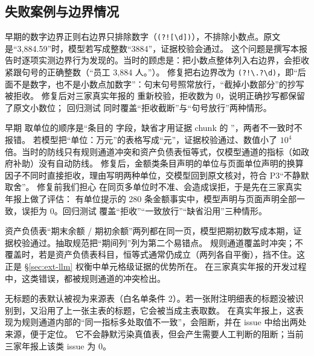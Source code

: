 \subsection{失败案例与边界情况}
\label{sec:ext-fail}

\begin{failcase}
早期的数字边界正则右边界只排除数字（\texttt{(?![\textbackslash d])}），不排除小数点。原文是“3,884.59”时，模型若写成整数“3884”，证据校验会通过。
这个问题是撰写本报告时逐项实测边界行为发现的。当时的顾虑是：把小数点整体列入右边界，会拒收紧跟句号的正确整数（“员工 3,884 人。”）。
修复把右边界改为 \texttt{(?!\textbackslash .?\textbackslash d)}，即“后面不是数字，也不是小数点加数字”：句末句号照常放行，“截掉小数部分”的抄写被拒收。
修复后对三家真实年报的  重新校验，拒收数为 0，说明正确抄写都保留了原文小数位；
回归测试  同时覆盖“拒收截断”与“句号放行”两种情形。
\end{failcase}

\begin{failcase}
早期  取单位的顺序是“条目的  字段，缺省才用证据 chunk 的 ”，两者不一致时不报错。
若模型把“单位：万元”的表格写成“元”，证据校验通过、数值小了 $10^4$ 倍。当时的防线只有规则通道冲突和资产负债表恒等式，仅模型通道的指标（如政府补助）没有自动防线。
修复后，金额类条目声明的单位与页面单位声明的换算因子不同时直接拒收，理由写明两种单位，交模型回到原文核对，符合 P3“不静默取舍”。
修复前我们担心  在同页多单位时不准、会造成误拒，于是先在三家真实年报上做了评估：
有单位提示的 280 条金额事实中，模型声明与页面声明全部一致，误拒为 0。回归测试  覆盖“拒收”“一致放行”“缺省沿用”三种情形。
\end{failcase}

\begin{failcase}
资产负债表“期末余额 / 期初余额”两列都在同一页，模型把期初数写成本期，证据校验通过。抽取规范把“期间列”列为第二个易错点。
规则通道覆盖时冲突；不覆盖时，若是资产负债表科目，恒等式通常仍成立（两列各自平衡），挡不住。这正是 \S\ref{sec:ext-llm} 权衡中单元格级证据的优势所在。
在三家真实年报的开发过程中，这类错误，都被规则通道的冲突检出。
\end{failcase}

\begin{failcase}[：表格标题识别失败导致白名单失效]
无标题的表默认被视为来源表（白名单条件 2）。若一张附注明细表的标题没被识别到，又沿用了上一张主表的标题，它会被当成主表取数。
在真实年报上，这表现为规则通道内部的“同一指标多处取值不一致”，会阻断，并在 issue 中给出两处来源，便于定位。
它不会静默污染真值表，但会产生需要人工判断的阻断；当前三家年报上该类 issue 为 0。
\end{failcase}

